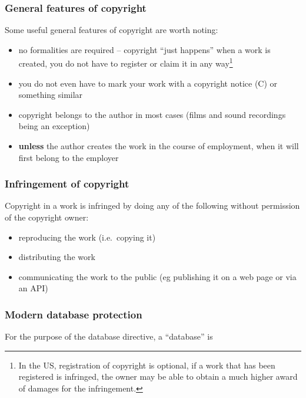 \subsubsection{General features of
copyright}\label{general-features-of-copyright}

Some useful general features of copyright are worth noting:

\begin{itemize}
\item
  no formalities are required -- copyright ``just happens'' when a work
  is created, you do not have to register or claim it in any
  way\footnote{In the US, registration of copyright is optional, if a
    work that has been registered is infringed, the owner may be able to
    obtain a much higher award of damages for the infringement.}
\item
  you do not even have to mark your work with a copyright notice (C) or
  something similar
\item
  copyright belongs to the author in most cases (films and sound
  recordings being an exception)
\item
  \textbf{unless} the author creates the work in the course of
  employment, when it will first belong to the employer
\end{itemize}

\subsubsection{Infringement of
copyright}\label{infringement-of-copyright}

Copyright in a work is infringed by doing any of the following without
permission of the copyright owner:

\begin{itemize}
\item
  reproducing the work (i.e.~copying it)
\item
  distributing the work
\item
  communicating the work to the public (eg publishing it on a web page
  or via an API)
\end{itemize}

\subsubsection{Modern database
protection}\label{modern-database-protection}

For the purpose of the database directive, a ``database'' is

